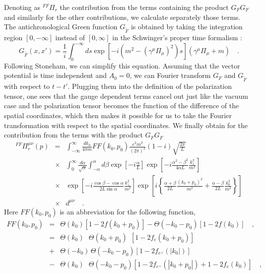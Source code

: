 Denoting as $^{FF}\Pi_{r}$ the contribution from the terms containing the
product $G_{F}G_{F}$ and similarly for the other contributions, we calculate
separately those terms. The antichronological Green function 
$G_{\tilde{F}}$ is obtained by taking the integration region 
$[0, -\infty]$ instead of $[0, \infty]$ in the Schwinger's proper 
time formalism :
\begin{equation}
G_{\tilde{F}}(x, x') = \frac{1}{i} \int^{-\infty}_{0}ds \exp
\left[-i \left( m^{2} - (\gamma^{\mu} \Pi_{\mu})^{2} \right )s \right ]
(\gamma^{\mu}\Pi_{\mu} + m) \quad .
\label{eq:anti}
\end{equation}
Following Stoneham, we can simplify this equation. Assuming that the vector
potential is time independent and $A_{0} = 0$, we can Fourier 
transform $G_{F}$ and $G_{\tilde{F}}$ with respect to $t-t'$. 
Plugging them into the definition of the polarization tensor, one sees 
that the gauge dependent terms cancel out just like the vacuum case and 
the polarization tensor becomes the function of the difference
of the spatial coordinates, which then makes it possible for us to take the
Fourier transformation with respect to the spatial coordinates. We 
finally obtain for the contribution from the terms with the product 
$G_{F}G_{F}$
\begin{eqnarray}
^{FF}\Pi_{r}^{\mu\nu}(p) & = & \int_{-\infty}^{\infty}
\frac{dk_{0}}{4\pi m} FF(k_{0}, p_{0})
\frac{e^{2}m^{2}}{(2\pi)^{2}}(1 - i) \sqrt{\frac{2\pi}{L}} \nonumber \\
& \times & \int^{\infty}_{0} \frac{d\alpha}{\sqrt{\alpha}}
\int^{\alpha}_{-\alpha} d\beta
\exp \left [-i\frac{\alpha}{L}\right] \exp 
\left[ - i \frac{\alpha ^{2} -
\beta ^{2}}{4\alpha L} \frac{k_{z}^{2}}{m^{2}} \right ] \nonumber \\
& \times & \exp \left [-i \frac{\cos \beta - \cos \alpha}
{2 L \sin \alpha}
\frac{k_{\perp}^{2}}{m^{2}} \right ] \exp \left [i \left\{
\frac{\alpha + \beta}{2L}
\frac{(k_{0} + p_{0})^{2}}{m^{2}} + \frac{\alpha - \beta}{2 L}
\frac{k_{0}^{2}}{m^{2}} \right \} \right ] \nonumber \\
& \times & d^{\mu\nu} \quad .
\label{eq:finpi}
\end{eqnarray}
Here $FF(k_{0}, p_{0})$ is an abbreviation for
the following function,
\begin{eqnarray}
FF(k_{0}, p_{0}) & = & \Theta (k_{0}) \left [1 - 2 f(k_{0} + p_{0}) \right ]
- \Theta (-k_{0} - p_{0}) \left [1 - 2 f(k_{0}) \right ] \quad ,\\
& = & \Theta (k_{0})\ \ \ \Theta (k_{0} + p_{0}) \ \
\left [1 - 2f_{e}(k_{0} + p_{0}) \right ]
\nonumber \\
& + & \Theta (-k_{0}) \, \Theta (-k_{0} - p_{0})
\left [1 - 2f_{e^{+}}(|k_{0}|) \right ]
\nonumber \\
& - & \Theta (k_{0}) \ \ \ \Theta (-k_{0} - p_{0})
\left [1 - 2f_{e^{+}}(|k_{0} + p_{0}|)
+ 1 - 2 f_{e}(k_{0}) \right ] \quad ,
\label{eq:defff}
\end{eqnarray}
